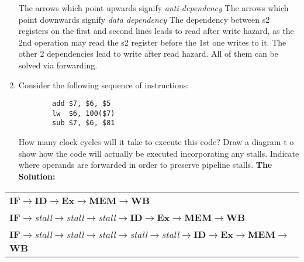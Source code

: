 \documentclass[12pt, a4paper]{article}
\begin{document}
\begin{enumerate}[start=1,label={\bfseries Question \arabic*:},leftmargin=1in]
    \begin{flushleft}  
        The arrows which point upwards signify \textit{anti-dependency}
        \newline
        The arrows which point downwards signify \textit{data dependency}
        \newline
        \newline
        The dependency between s2 registers on the first and second lines leads to read after write hazard, as the 2nd operation may read the s2 register before the 1st one writes to it.
        \newline
        The other 2 dependencies lead to write after read hazard.
        \newline
        All of them can be solved via forwarding.
    \end{flushleft}

    \newpage
    \item 
    \begin{flushleft}
        Consider the following sequence of instructions:
    \end{flushleft}
    \begin{lstlisting}
        add $7, $6, $5
        lw  $6, 100($7)
        sub $7, $6, $81
    \end{lstlisting}
    \begin{flushleft}
        How many clock cycles will it take to execute this code? Draw a diagram t o show  how the code will actually be executed incorporating any stalls. Indicate where operands are forwarded in order to preserve pipeline stalls.
        \newline
        \newline
        \textbf{The Solution:}
    \end{flushleft}
\end{enumerate}
\begin{tabular}{l}
    \textbf{IF}$\rightarrow$\textbf{ID}$\rightarrow$\textbf{Ex}$\rightarrow$\textbf{MEM}$\rightarrow$\textbf{WB} \\
    \hspace{9mm}\textbf{IF}$\rightarrow$\textit{stall}$\rightarrow$\textit{stall}$\rightarrow$\textit{stall}$\rightarrow$\textbf{ID}$\rightarrow$\textbf{Ex}$\rightarrow$\textbf{MEM}$\rightarrow$\textbf{WB} \\
    \hspace{1.9cm}\textbf{IF}$\rightarrow$\textit{stall}$\rightarrow$\textit{stall}$\rightarrow$\textit{stall}$\rightarrow$\textit{stall}$\rightarrow$\textit{stall}$\rightarrow$\textbf{ID}$\rightarrow$\textbf{Ex}$\rightarrow$\textbf{MEM}$\rightarrow$\textbf{WB}
\end{tabular}
\end{document}
